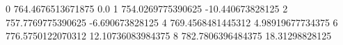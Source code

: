 0 764.4676513671875 0.0
1 754.0269775390625 -10.440673828125
2 757.7769775390625 -6.690673828125
4 769.4568481445312 4.98919677734375
6 776.5750122070312 12.10736083984375
8 782.7806396484375 18.31298828125
